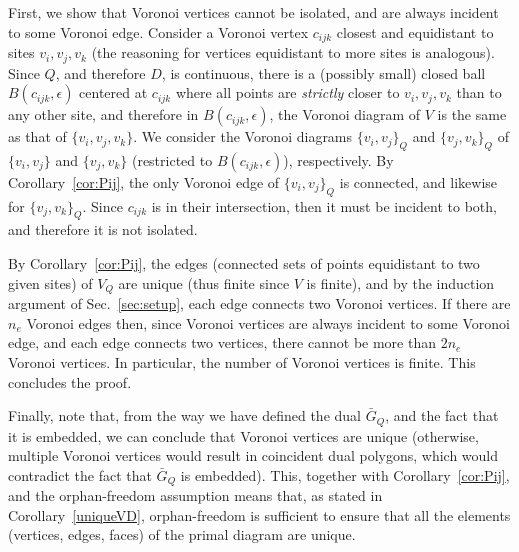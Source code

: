 \documentclass[11pt]{article}
\begin{document}
First, we show that Voronoi vertices cannot be isolated, and are always incident to some Voronoi edge. Consider a Voronoi vertex $c_{ijk}$ closest and equidistant to sites $v_i,v_j,v_k$ (the reasoning for vertices equidistant to more sites is analogous). 
Since $Q$, and therefore $D$, is continuous, there is a (possibly small) closed ball $B(c_{ijk},\epsilon)$ centered at $c_{ijk}$ where all points are \emph{strictly} closer to $v_i,v_j,v_k$ than to any other site, and therefore in $B(c_{ijk},\epsilon)$, the Voronoi diagram of $V$ is the same as that of $\{v_i,v_j,v_k\}$. 
We consider the Voronoi diagrams $\{v_i,v_j\}_Q$ and $\{v_j,v_k\}_Q$ of $\{v_i,v_j\}$ and $\{v_j,v_k\}$ (restricted to  $B(c_{ijk},\epsilon)$), respectively. 
By Corollary~\ref{cor:Pij}, the only Voronoi edge of $\{v_i,v_j\}_Q$ is connected, and likewise for $\{v_j,v_k\}_Q$. Since $c_{ijk}$ is in their intersection, then it must be incident to both, and therefore it is not isolated. 


By Corollary~\ref{cor:Pij}, the edges (connected sets of points equidistant to two given sites) of $V_Q$ are unique (thus finite since $V$ is finite), and by the induction argument of Sec.~\ref{sec:setup}, each edge connects two Voronoi vertices. If there are $n_e$ Voronoi edges then, since Voronoi vertices are always incident to some Voronoi edge, and each edge connects two vertices, there cannot be more than $2 n_e$ Voronoi vertices. In particular, the number of Voronoi vertices is finite. This concludes the proof. 

Finally, note that, from the way we have defined the dual $\bar{G}_Q$, and the fact that it is embedded, we can conclude that Voronoi vertices are unique (otherwise, multiple Voronoi vertices would result in coincident dual polygons, which would contradict the fact that $\bar{G}_Q$ is embedded). 
This, together with Corollary~\ref{cor:Pij}, and the  orphan-freedom assumption means that, as stated in Corollary~\ref{uniqueVD}, orphan-freedom is sufficient to ensure that all the elements (vertices, edges, faces) of the primal diagram are unique. 
\end{document}
